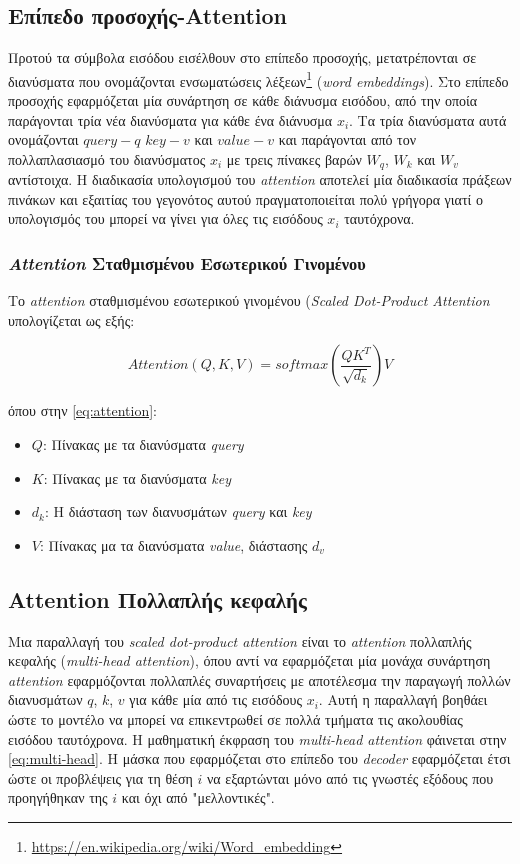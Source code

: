 \subsection{Επίπεδο προσοχής-Attention}
Προτού τα σύμβολα εισόδου εισέλθουν στο επίπεδο προσοχής, μετατρέπονται σε διανύσματα που ονομάζονται ενσωματώσεις λέξεων\footnote{\url{https://en.wikipedia.org/wiki/Word_embedding}} (\emph{word embeddings}). Στο επίπεδο προσοχής εφαρμόζεται μία συνάρτηση σε κάθε διάνυσμα εισόδου, από την οποία παράγονται τρία νέα διανύσματα για κάθε ένα διάνυσμα $x_i$. Τα τρία διανύσματα αυτά ονομάζονται $query-q$ $key-v$ και $value-v$ και παράγονται από τον πολλαπλασιασμό του διανύσματος $x_i$ με τρεις πίνακες βαρών $W_q$, $W_k$ και $W_v$ αντίστοιχα. Η διαδικασία υπολογισμού του \emph{attention} αποτελεί μία διαδικασία πράξεων πινάκων και εξαιτίας του γεγονότος αυτού πραγματοποιείται πολύ γρήγορα γιατί ο υπολογισμός του μπορεί να γίνει για όλες τις εισόδους $x_i$ ταυτόχρονα.

\subsubsection{\emph{Attention} Σταθμισμένου Εσωτερικού Γινομένου}
Το \emph{attention} σταθμισμένου εσωτερικού γινομένου (\emph{Scaled Dot-Product Attention} υπολογίζεται ως εξής:

\begin{equation}
    \label{eq:attention}
    Attention(Q,K,V) = softmax(\frac{QK^T}{\sqrt{d_k}})V
\end{equation}

όπου στην \autoref{eq:attention}:
\begin{itemize}
    \item $Q$: Πίνακας με τα διανύσματα \emph{query}
    \item $K$: Πίνακας με τα διανύσματα \emph{key}
    \item $d_k$: Η διάσταση των διανυσμάτων \emph{query} και \emph{key}
    \item $V$: Πίνακας μα τα διανύσματα \emph{value}, διάστασης $d_v$
\end{itemize}

\subsection{Attention Πολλαπλής κεφαλής}
Μια παραλλαγή του \emph{scaled dot-product attention} είναι το \emph{attention} πολλαπλής κεφαλής (\emph{multi-head attention}), όπου αντί να εφαρμόζεται μία μονάχα συνάρτηση \emph{attention} εφαρμόζονται πολλαπλές συναρτήσεις με αποτέλεσμα την παραγωγή πολλών διανυσμάτων $q$, $k$, $v$ για κάθε μία από τις εισόδους $x_i$. Αυτή η παραλλαγή βοηθάει ώστε το μοντέλο να μπορεί να επικεντρωθεί σε πολλά τμήματα τις ακολουθίας εισόδου ταυτόχρονα. Η μαθηματική έκφραση του \emph{multi-head attention} φάινεται στην \autoref{eq:multi-head}. Η μάσκα που εφαρμόζεται στο επίπεδο του \emph{decoder} εφαρμόζεται έτσι ώστε οι προβλέψεις για τη θέση $i$ να εξαρτώνται μόνο από τις γνωστές εξόδους που προηγήθηκαν της $i$ και όχι από "μελλοντικές".

